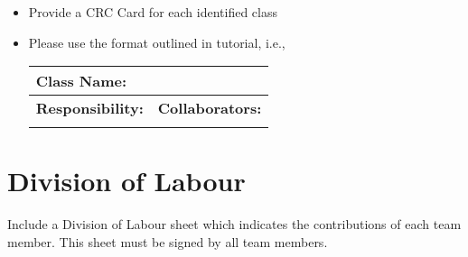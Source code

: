 \documentclass[]{article}
\begin{document}
\begin{itemize}
	\item Provide a CRC Card for each identified class
	\item Please use the format outlined in tutorial, i.e.,
	      \begin{table}[ht]
		      \centering
		      \begin{tabular}{|p{5cm}|p{5cm}|}
			      \hline
			      \multicolumn{2}{|l|}{\textbf{Class Name:}}         \\
			      \hline
			      \textbf{Responsibility:} & \textbf{Collaborators:} \\
			      \hline
			      \vspace{1in}             &                         \\
			      \hline
		      \end{tabular}
	      \end{table}

\end{itemize}

\appendix
\section{Division of Labour}
\label{sec:division_of_labour}
Include a Division of Labour sheet which indicates the contributions of each team member. This sheet must be signed by all team members.
\end{document}
